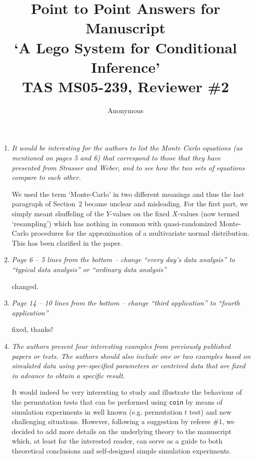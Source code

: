 \documentclass[11pt]{article}
\begin{document}
\title{Point to Point Answers for Manuscript \\
`A Lego System for Conditional Inference' \\
TAS MS05-239, Reviewer \#2}
\author{Anonymous}
\maketitle

\begin{enumerate}

\item \textsl{It would be interesting for the authors to list the Monte Carlo equations
              (as mentioned on pages 5 and 6) that correspond to those that they have 
              presented from Strasser and Weber, and to see how the two sets of equations 
              compare to each other.}

We used the term `Monte-Carlo' in two different meanings and thus the last
paragraph of Section~2 became unclear and misleading. For the first part, we
simply meant shuffeling of the $Y$-values on the fixed $X$-values (now
termed `resampling') which has nothing in common with quasi-randomized
Monte-Carlo procedures for the approximation of a multivariate normal
distribution. This has been clarified in the paper.

\item \textsl{Page 6 – 5 lines from the bottom – change “every day’s data analysis” to
              “typical data analysis” or “ordinary data analysis”}

changed.

\item \textsl{Page 14 – 10 lines from the bottom – change “third application” to
              “fourth application”}

fixed, thanks!

\item \textsl{The authors present four interesting examples from previously published
              papers or texts. The authors should also include one or two examples 
              based on simulated data using pre-specified
              parameters or contrived data that are fixed in advance to obtain a specific
              result.}

It would indeed be very interesting to study and illustrate the behaviour of the
permutation tests that can be performed using \texttt{coin} by means of
simulation experiments in well known (e.g. permutation $t$ test) and new
challenging situations. However, following a suggestion by referee \#1, we
decided to add more details on the underlying theory to the manuscript
which, at least for the interested reader, can serve as a guide to both
theoretical conclusions and self-designed simple simulation experiments. 


\end{enumerate}
\end{document}
